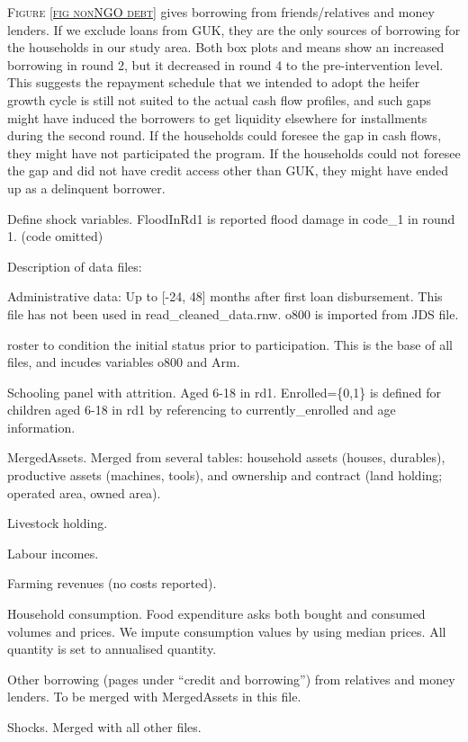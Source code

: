 \vspace{2ex}
\textsc{\small Figure \ref{fig nonNGO debt}} gives borrowing from friends/relatives and money lenders. If we exclude loans from GUK, they are the only sources of borrowing for the households in our study area. Both box plots and means show an increased borrowing in round 2, but it decreased in round 4 to the pre-intervention level. This suggests the repayment schedule that we intended to adopt the heifer growth cycle is still not suited to the actual cash flow profiles, and such gaps might have induced the borrowers to get liquidity elsewhere for installments during the second round. If the households could foresee the gap in cash flows, they might have not participated the program. If the households could not foresee the gap and did not have credit access other than GUK, they might have ended up as a delinquent borrower.

Define shock variables. \textsf{FloodInRd1} is reported flood damage in \textsf{code\_1} in round 1. \textsf{(code omitted)}


\vspace{2ex}
Description of data files:
\begin{description}
\vspace{1.0ex}\setlength{\itemsep}{1.0ex}\setlength{\baselineskip}{12pt}
\item[ad]	Administrative data: Up to [-24, 48] months after first loan disbursement. This file has not been used in \textsf{read\_cleaned\_data.rnw}. \textsf{o800} is imported from JDS file.
\item[ros]	 \textsf{roster} to condition the initial status prior to participation. This is the base of all files, and incudes variables \textsf{o800} and \textsf{Arm}.
\item[sch]	Schooling panel with attrition. Aged 6-18 in rd1. \textsf{Enrolled=\{0,1\}} is defined for children aged 6-18 in rd1 by referencing to \textsf{currently\_enrolled} and age information.
\item[ass]	 MergedAssets. Merged from several tables: household assets (houses, durables), productive assets (machines, tools), and ownership and contract (land holding; operated area, owned area). 
\item[lvo]	Livestock holding. 
\item[lab]	Labour incomes.
\item[far]	Farming revenues (no costs reported).
\item[con]	Household consumption. Food expenditure asks both bought and consumed volumes and prices. We impute consumption values by using median prices. All quantity is set to annualised quantity.
\item[obr]	Other borrowing (pages under ``credit and borrowing'') from relatives and money lenders. To be merged with MergedAssets in this file.
\item[shk]	Shocks. Merged with all other files.
\end{description}

